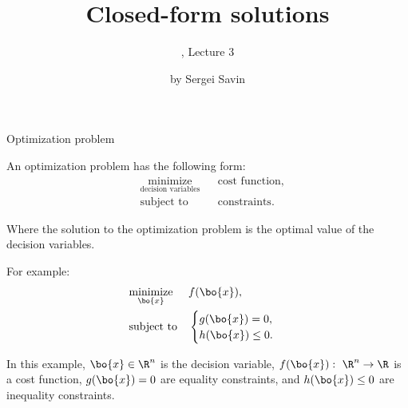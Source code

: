 \documentclass{beamer}
\title{Closed-form solutions}
\subtitle{\mycoursetitle, Lecture 3}
\author{by Sergei Savin}
\date{\mydate}
\begin{document}
\maketitle


%
%




\begin{frame}{Optimization problem}
	\begin{flushleft}
		
		An optimization problem has the following form:
		\begin{equation}
			\begin{aligned}
				& \underset{\text{decision variables}}{\text{minimize}}
				& & \text{cost function}, \\
				& \text{subject to}
				& & \text{constraints}.
			\end{aligned}
		\end{equation}
	
		Where the solution to the optimization problem is the optimal value of the decision variables.
		
		\bigskip
		
		For example:
		\begin{equation}
			\begin{aligned}
				& \underset{\bo{x}}{\text{minimize}}
				& & f(\bo{x}), \\
				& \text{subject to}
				& & \begin{cases}
					g(\bo{x}) = 0, \\
					h(\bo{x}) \leq 0.
				\end{cases}
			\end{aligned}
		\end{equation}
	
	In this example, $\bo{x} \in \R^n$ is the decision variable, $f(\bo{x}): \ \R^n \rightarrow \R$ is a cost function, $g(\bo{x}) = 0$ are equality constraints, and $h(\bo{x}) \leq 0$ are inequality constraints.

	\end{flushleft}
\end{frame}
\end{document}
